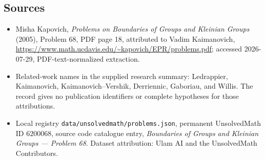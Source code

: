 \documentclass[11pt]{article}
\begin{document}
\subsection{Sources}
\begin{itemize}
\item Misha Kapovich, \emph{Problems on Boundaries of Groups and Kleinian Groups} (2005), Problem 68, PDF page 18, attributed to Vadim Kaimanovich, \url{https://www.math.ucdavis.edu/~kapovich/EPR/problems.pdf}; accessed 2026-07-29, PDF-text-normalized extraction.
\item Related-work names in the supplied research summary: Ledrappier, Kaimanovich, Kaimanovich--Vershik, Derriennic, Gaboriau, and Willis. The record gives no publication identifiers or complete hypotheses for those attributions.
\item Local registry \texttt{data/unsolvedmath/problems.json}, permanent UnsolvedMath ID $6200068$, source code catalogue entry, \emph{Boundaries of Groups and Kleinian Groups --- Problem 68}. Dataset attribution: Ulam AI and the UnsolvedMath Contributors.
\end{itemize}
\end{document}
